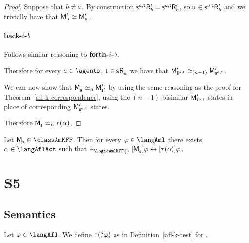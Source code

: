 \begin{proof}
Suppose that $b \neq a$.
By construction $\aPStateS[\agentA,\aStateT] \aAccessibilityP{\agentB} = \aStateS[\agentA,\aStateT] \aAccessibilityP{\agentB}$, so $\aStateU \in \aStateS[\agentA,\aStateT] \aAccessibilityP{\agentB}$ and we trivially have that $\aPModelP{\aStateU} \bisimilar \aPModelP{\aStateU}$.

\paragraph{back-$i$-$b$} Follows similar reasoning to {\bf forth-$i$-$b$}.

Therefore for every $\agentA \in \agents$, $\aStateT \in \aStateS \aAccessibility{\agentA}$ we have that $\aPModelP{\aPStateS[\agentA,\aStateT]} \bisimilar[(n - 1)] \aPModelP{\aStateS[\agentA,\aStateT]}$.

We can now show that $\aPModel{\aStateS} \bisimilar[n] \aPModelP{\aStateSP}$ by using the same reasoning as the proof for Theorem~\ref{afl-k-correspondence}, using the $(n - 1)$-bisimilar $\aPModelP{\aPStateS[\agentA,\aStateT]}$ states in place of corresponding $\aPModelP{\aStateS[\agentA,\aStateT]}$ states.

Therefore $\aPModel{\aStateS} \bisimilar[n] \tau(\alpha)$.
\end{proof}

\begin{corollary}
Let $\aPModel{\aStateS} \in \classAmKFF$.
Then for every $\phi \in \langAml$ there exists $\alpha \in \langAflAct$ such that $\entails_\logicAmlKFF{} \actionA{\aPModel{\aStateS}} \phi \iff \actionA{\tau(\alpha)} \phi$.
\end{corollary}

\section{S5}

\subsection{Semantics}

\begin{definition}[Test]\label{afl-kff-test}
Let $\phi \in \langAfl$.
We define $\tau(?{\varphi})$ as in Definition~\ref{afl-k-test} for \classK{}.
\end{definition}

